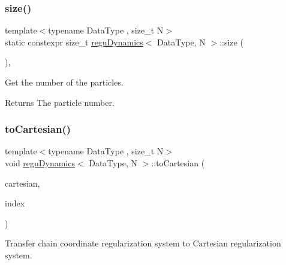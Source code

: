 \subsubsection{\texorpdfstring{size()}{size()}}
{\footnotesize\ttfamily template$<$typename Data\+Type , size\+\_\+t N$>$ \\
static constexpr size\+\_\+t \mbox{\hyperlink{classregu_dynamics}{regu\+Dynamics}}$<$ Data\+Type, N $>$\+::size (\begin{DoxyParamCaption}{ }\end{DoxyParamCaption})\hspace{0.3cm}{\ttfamily [inline]}, {\ttfamily [static]}}



Get the number of the particles. 

\begin{DoxyReturn}{Returns}
The particle number. 
\end{DoxyReturn}
\mbox{\label{classregu_dynamics_a3dd8d377588308a02396ca6d06945859}} 
\subsubsection{\texorpdfstring{to\+Cartesian()}{toCartesian()}}
{\footnotesize\ttfamily template$<$typename Data\+Type , size\+\_\+t N$>$ \\
void \mbox{\hyperlink{classregu_dynamics}{regu\+Dynamics}}$<$ Data\+Type, N $>$\+::to\+Cartesian (\begin{DoxyParamCaption}\item[{\mbox{\hyperlink{classregu_dynamics}{regu\+Dynamics}}$<$ Data\+Type, N $>$ \&}]{cartesian,  }\item[{\mbox{\hyperlink{classregu_dynamics_a2c9fa7372e4a11be9d85728b4a0e455f}{Index\+Array}} \&}]{index }\end{DoxyParamCaption})\hspace{0.3cm}{\ttfamily [inline]}}



Transfer chain coordinate regularization system to Cartesian regularization system. 

